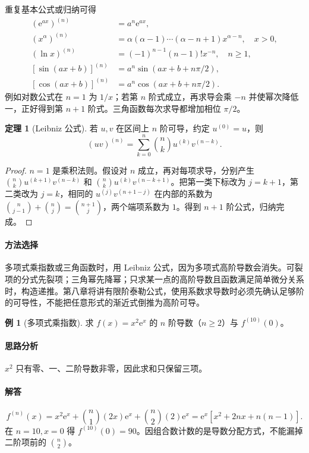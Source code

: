 \documentclass[UTF8,fontset=fandol,12pt,oneside,openany]{ctexrep}
\newcommand{\ee}{\mathrm e}
\theoremstyle{definition}
\newtheorem{theorem}{定理}[chapter]
\newtheorem{example}{例}[chapter]
\begin{document}
重复基本公式或归纳可得
\begin{align*}
 (\ee^{ax})^{(n)}&=a^n\ee^{ax},\\
 (x^\alpha)^{(n)}&=\alpha(\alpha-1)\cdots(\alpha-n+1)x^{\alpha-n},\quad x>0,\\
 (\ln x)^{(n)}&=(-1)^{n-1}(n-1)!x^{-n},\quad n\ge1,\\
 [\sin(ax+b)]^{(n)}&=a^n\sin(ax+b+n\pi/2),\\
 [\cos(ax+b)]^{(n)}&=a^n\cos(ax+b+n\pi/2).
\end{align*}
例如对数公式在 $n=1$ 为 $1/x$；若第 $n$ 阶式成立，再求导会乘 $-n$ 并使幂次降低一，正好得到第 $n+1$ 阶式。三角函数每次求导都增加相位 $\pi/2$。

\begin{theorem}[Leibniz 公式]
若 $u,v$ 在区间上 $n$ 阶可导，约定 $u^{(0)}=u$，则
\[
 (uv)^{(n)}=\sum_{k=0}^n\binom nk u^{(k)}v^{(n-k)}.
\]
\end{theorem}
\begin{proof}
$n=1$ 是乘积法则。假设对 $n$ 成立，再对每项求导，分别产生
$\binom nk u^{(k+1)}v^{(n-k)}$ 和 $\binom nk u^{(k)}v^{(n-k+1)}$。把第一类下标改为 $j=k+1$，第二类改为 $j=k$，相同的 $u^{(j)}v^{(n+1-j)}$ 在内部的系数为
$\binom n{j-1}+\binom nj=\binom{n+1}j$，两个端项系数为 $1$。得到 $n+1$ 阶公式，归纳完成。
\end{proof}

\paragraph{方法选择}多项式乘指数或三角函数时，用 Leibniz 公式，因为多项式高阶导数会消失。可裂项的分式先裂项；三角幂先降幂；只求某一点的高阶导数且函数满足简单微分关系时，构造递推。第八章将讲有限阶泰勒公式，使用系数求导数时必须先确认足够阶的可导性，不能把任意形式的渐近式倒推为高阶可导。

\begin{example}[多项式乘指数]
求 $f(x)=x^2\ee^x$ 的 $n$ 阶导数（$n\ge2$）与 $f^{(10)}(0)$。
\end{example}
\paragraph{思路分析}$x^2$ 只有零、一、二阶导数非零，因此求和只保留三项。
\paragraph{解答}
\[
 f^{(n)}(x)=x^2\ee^x+\binom n1(2x)\ee^x+\binom n2(2)\ee^x
 =\ee^x[x^2+2nx+n(n-1)].
\]
在 $n=10,x=0$ 得 $f^{(10)}(0)=90$。因组合数计数的是导数分配方式，不能漏掉二阶项前的 $\binom n2$。
\end{document}
